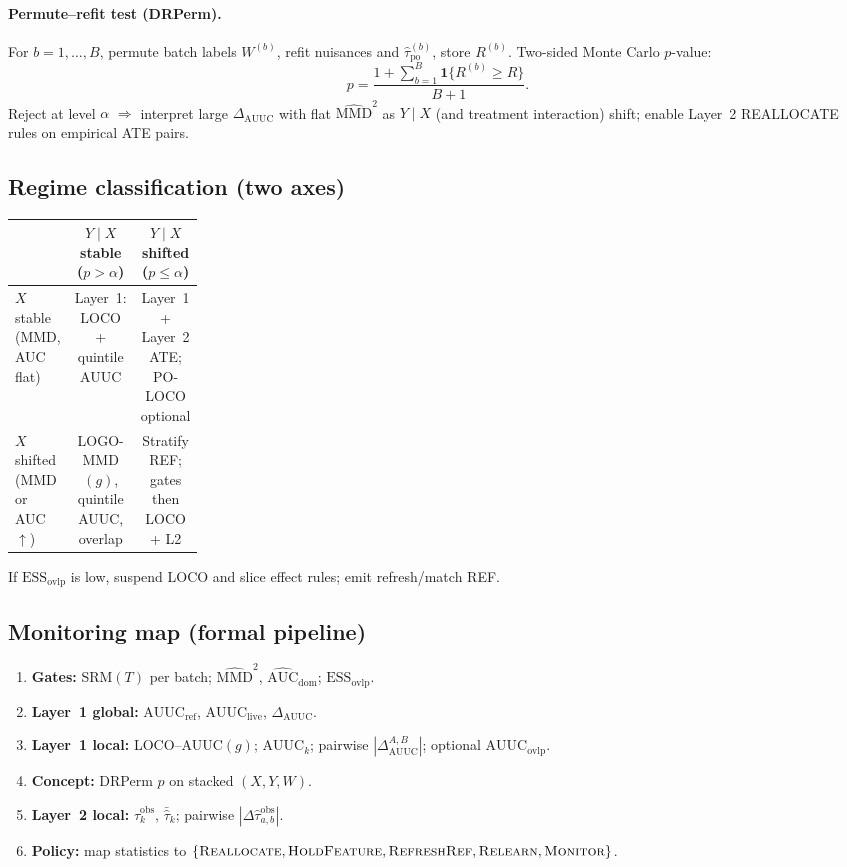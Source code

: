 \paragraph{Permute--refit test (DRPerm).}
For $b=1,\ldots,B$, permute batch labels $W^{(b)}$, refit nuisances and $\hat\tau_{\mathrm{po}}^{(b)}$, store $R^{(b)}$.
Two-sided Monte Carlo $p$-value:
\[
  p = \frac{1+\sum_{b=1}^B \mathbf 1\{ R^{(b)}\ge R\}}{B+1}.
\]
Reject at level $\alpha$ $\Rightarrow$ interpret large $\Delta_{\mathrm{AUUC}}$ with flat $\widehat{\mathrm{MMD}}^2$ as $Y\mid X$ (and treatment interaction) shift; enable Layer~2 REALLOCATE rules on empirical ATE pairs.

\subsection{Regime classification (two axes)}

\begin{center}
\small
\begin{tabular}{@{}p{0.22\linewidth}cc@{}}
\toprule
 & $Y\mid X$ stable ($p>\alpha$) & $Y\mid X$ shifted ($p\le\alpha$) \\
\midrule
$X$ stable (MMD, AUC flat) &
Layer~1: LOCO + quintile AUUC &
Layer~1 + Layer~2 ATE; PO-LOCO optional \\
\midrule
$X$ shifted (MMD or AUC $\uparrow$) &
LOGO-MMD$(g)$, quintile AUUC, overlap &
Stratify REF; gates then LOCO + L2 \\
\bottomrule
\end{tabular}
\end{center}

If $\mathrm{ESS}_{\mathrm{ovlp}}$ is low, suspend LOCO and slice effect rules; emit refresh/match REF.

\subsection{Monitoring map (formal pipeline)}

\begin{enumerate}
  \item \textbf{Gates:} SRM$(T)$ per batch; $\widehat{\mathrm{MMD}}^2$, $\widehat{\mathrm{AUC}}_{\mathrm{dom}}$; $\mathrm{ESS}_{\mathrm{ovlp}}$.
  \item \textbf{Layer~1 global:} $\mathrm{AUUC}_{\mathrm{ref}}$, $\mathrm{AUUC}_{\mathrm{live}}$, $\Delta_{\mathrm{AUUC}}$.
  \item \textbf{Layer~1 local:} LOCO--AUUC$(g)$; $\mathrm{AUUC}_k$; pairwise $|\Delta_{\mathrm{AUUC}}^{A,B}|$; optional $\mathrm{AUUC}_{\mathrm{ovlp}}$.
  \item \textbf{Concept:} DRPerm $p$ on stacked $(X,Y,W)$.
  \item \textbf{Layer~2 local:} $\widehat{\tau}^{\mathrm{obs}}_k$, $\bar{\hat\tau}_k$; pairwise $|\Delta\widehat{\tau}^{\mathrm{obs}}_{a,b}|$.
  \item \textbf{Policy:} map statistics to $\{\textsc{Reallocate},\textsc{HoldFeature},\textsc{RefreshRef},\textsc{Relearn},\textsc{Monitor}\}$.
\end{enumerate}


